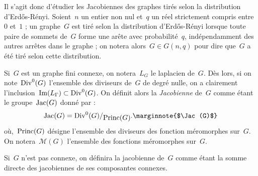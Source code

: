\vspace*{0.3cm}
	Il s'agit donc d'étudier les Jacobiennes des graphes tirés selon la distribution d'Erd\H{o}s-Rényi. Soient~$n$ un entier non nul et~$q$ un réel strictement compris entre~$0$ et~$1$ ; un graphe~$G$ est tiré selon la distribution d'Erd\H{o}s-Rényi lorsque toute paire de sommets de~$G$ forme une arête avec probabilité~$q$, indépendamment des autres arrêtes dans le graphe ; on notera alors~$G\in G(n,q)$ pour dire que~$G$ a été tiré selon cette distribution.
	
	Si~$G$ est un graphe fini connexe, on notera~$L_G$ le laplacien de~$G$. Dès lors, si on note~$\operatorname{Div}^0(G)$ l'ensemble des diviseurs de~$G$ de degré nulle, on a clairement l'inclusion~$\operatorname{Im}(L_\Gamma) \subset \operatorname{Div}^0(G)$. On définit alors la \emph{Jacobienne} de~$G$ comme étant le groupe~$\operatorname{Jac}(G)$ donné par :
	\[
		\Jac(G) = \quotient{\Div^0(G)}{\Princ(G)}.\text{\marginnote{$\Jac(G)$}}
	\]
	où,~$\operatorname{Princ}(G)$ désigne l'ensemble des diviseurs des fonction méromorphes sur~$G$. On notera~$\mathcal{M}(G)$ l'ensemble des fonctions méromorphes sur~$G$.
	
	 Si~$G$ n'est pas connexe, on définira la jacobienne de~$G$ comme étant la somme directe des jacobiennes de ses composantes connexes. 